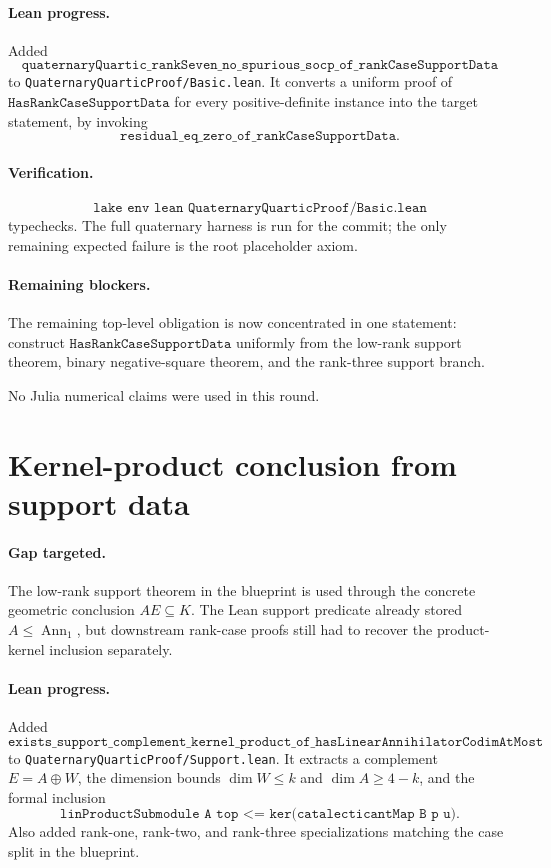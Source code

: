 \documentclass[11pt]{article}
\begin{document}
\paragraph{Lean progress.}
Added
\[
\texttt{quaternaryQuartic\_rankSeven\_no\_spurious\_socp\_of\_rankCaseSupportData}
\]
to \texttt{QuaternaryQuarticProof/Basic.lean}.  It converts a uniform proof of
\(\texttt{HasRankCaseSupportData}\) for every positive-definite instance into
the target statement, by invoking
\[
\texttt{residual\_eq\_zero\_of\_rankCaseSupportData}.
\]

\paragraph{Verification.}
\[
\texttt{lake env lean QuaternaryQuarticProof/Basic.lean}
\]
typechecks.  The full quaternary harness is run for the commit; the only
remaining expected failure is the root placeholder axiom.

\paragraph{Remaining blockers.}
The remaining top-level obligation is now concentrated in one statement:
construct \(\texttt{HasRankCaseSupportData}\) uniformly from the low-rank
support theorem, binary negative-square theorem, and the rank-three support
branch.

No Julia numerical claims were used in this round.

\section*{Kernel-product conclusion from support data}

\paragraph{Gap targeted.}
The low-rank support theorem in the blueprint is used through the concrete
geometric conclusion \(AE\subseteq K\).  The Lean support predicate already
stored \(A\le\operatorname{Ann}_1\), but downstream rank-case proofs still had
to recover the product-kernel inclusion separately.

\paragraph{Lean progress.}
Added
\[
\texttt{exists\_support\_complement\_kernel\_product\_of\_hasLinearAnnihilatorCodimAtMost}
\]
to \texttt{QuaternaryQuarticProof/Support.lean}.  It extracts a complement
\(E=A\oplus W\), the dimension bounds \(\dim W\le k\) and
\(\dim A\ge 4-k\), and the formal inclusion
\[
\texttt{linProductSubmodule A top <= ker(catalecticantMap B p u)}.
\]
Also added rank-one, rank-two, and rank-three specializations matching the
case split in the blueprint.
\end{document}
